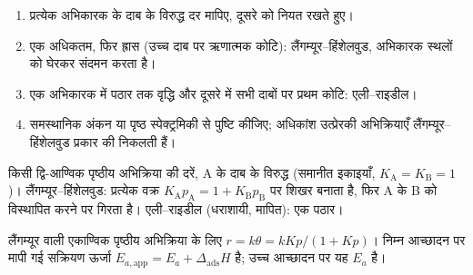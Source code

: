 \begin{method}[दाब-निर्भरता से LH या ER]\label{met:b3:surfaces-catalysis:mechanism-from-rate}
\begin{enumerate}
  \item प्रत्येक अभिकारक के दाब के विरुद्ध दर मापिए, दूसरे को नियत
        रखते हुए।
  \item एक अधिकतम, फिर ह्रास (उच्च दाब पर ऋणात्मक कोटि):
        लैंगम्यूर--हिंशेलवुड, अभिकारक स्थलों को घेरकर संदमन करता है।
  \item एक अभिकारक में पठार तक वृद्धि और दूसरे में सभी
        दाबों पर प्रथम कोटि: एली--राइडील।
  \item समस्थानिक अंकन या पृष्ठ स्पेक्ट्रमिकी से पुष्टि कीजिए; अधिकांश उत्प्रेरकी
        अभिक्रियाएँ लैंगम्यूर--हिंशेलवुड प्रकार की निकलती हैं।
\end{enumerate}
\end{method}

\begin{omfigure}

{\small किसी द्वि-आण्विक पृष्ठीय अभिक्रिया की दरें, A के दाब के विरुद्ध
(समानीत इकाइयाँ, $K_{\mathrm A} = K_{\mathrm B} = 1$)। लैंगम्यूर--हिंशेलवुड: प्रत्येक वक्र $K_{\mathrm A}p_{\mathrm A} =
1 + K_{\mathrm B}p_{\mathrm B}$ पर शिखर बनाता है, फिर A के B को विस्थापित करने पर गिरता है। एली--राइडील (धराशायी, मापित): एक पठार।}
\end{omfigure}

\begin{proposition}[आभासी सक्रियण ऊर्जा]\label{prop:b3:surfaces-catalysis:apparent-ea}
लैंगम्यूर  वाली एकाण्विक पृष्ठीय अभिक्रिया के लिए $r = k\theta = kKp/(1 + Kp)$।
निम्न आच्छादन पर मापी गई सक्रियण ऊर्जा $E_{a,\mathrm{app}} = E_a + \Delta_{\mathrm{ads}}H$ है;
उच्च आच्छादन पर यह $E_a$ है।
\end{proposition}

